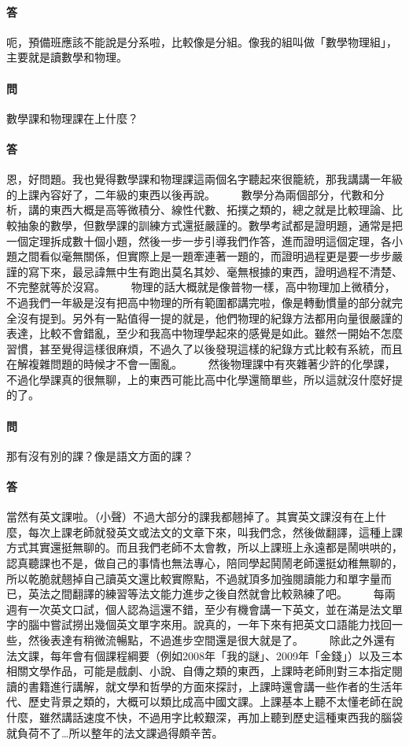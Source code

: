 \documentclass[a4paper]{article}
\begin{document}
\paragraph{答}
呃，預備班應該不能說是分系啦，比較像是分組。像我的組叫做「數學物理組」，主要就是讀數學和物理。
\paragraph{問}
數學課和物理課在上什麼？
\paragraph{答}
恩，好問題。我也覺得數學課和物理課這兩個名字聽起來很籠統，那我講講一年級的上課內容好了，二年級的東西以後再說。
　　數學分為兩個部分，代數和分析，講的東西大概是高等微積分、線性代數、拓撲之類的，總之就是比較理論、比較抽象的數學，但數學課的訓練方式還挺嚴謹的。數學考試都是證明題，通常是把一個定理拆成數十個小題，然後一步一步引導我們作答，進而證明這個定理，各小題之間看似毫無關係，但實際上是一題牽連著一題的，而證明過程更是要一步步嚴謹的寫下來，最忌諱無中生有跑出莫名其妙、毫無根據的東西，證明過程不清楚、不完整就等於沒寫。
　　物理的話大概就是像普物一樣，高中物理加上微積分，不過我們一年級是沒有把高中物理的所有範圍都講完啦，像是轉動慣量的部分就完全沒有提到。另外有一點值得一提的就是，他們物理的紀錄方法都用向量很嚴謹的表達，比較不會錯亂，至少和我高中物理學起來的感覺是如此。雖然一開始不怎麼習慣，甚至覺得這樣很麻煩，不過久了以後發現這樣的紀錄方式比較有系統，而且在解複雜問題的時候才不會一團亂。
　　然後物理課中有夾雜著少許的化學課，不過化學課真的很無聊，上的東西可能比高中化學還簡單些，所以這就沒什麼好提的了。
\paragraph{問}
那有沒有別的課？像是語文方面的課？
\paragraph{答}
當然有英文課啦。（小聲）不過大部分的課我都翹掉了。其實英文課沒有在上什麼，每次上課老師就發英文或法文的文章下來，叫我們念，然後做翻譯，這種上課方式其實還挺無聊的。而且我們老師不太會教，所以上課班上永遠都是鬧哄哄的，認真聽課也不是，做自己的事情也無法專心，陪同學起鬨鬧老師還挺幼稚無聊的，所以乾脆就翹掉自己讀英文還比較實際點，不過就頂多加強閱讀能力和單字量而已，英法之間翻譯的練習等法文能力進步之後自然就會比較熟練了吧。
　　每兩週有一次英文口試，個人認為這還不錯，至少有機會講一下英文，並在滿是法文單字的腦中嘗試撈出幾個英文單字來用。說真的，一年下來有把英文口語能力找回一些，然後表達有稍微流暢點，不過進步空間還是很大就是了。
　　除此之外還有法文課，每年會有個課程綱要（例如2008年「我的謎」、2009年「金錢」）以及三本相關文學作品，可能是戲劇、小說、自傳之類的東西，上課時老師則對三本指定閱讀的書籍進行講解，就文學和哲學的方面來探討，上課時還會講一些作者的生活年代、歷史背景之類的，大概可以類比成高中國文課。上課基本上聽不太懂老師在說什麼，雖然講話速度不快，不過用字比較艱深，再加上聽到歷史這種東西我的腦袋就負荷不了…所以整年的法文課過得頗辛苦。
\end{document}
